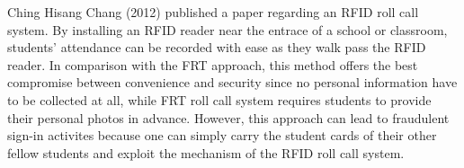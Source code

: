 Ching Hisang Chang (2012) published a paper regarding an RFID roll call system.
By installing an RFID reader near the entrace of a school or classroom, students' attendance
can be recorded with ease as they walk pass the RFID reader. In comparison with the FRT approach,
this method offers the best compromise between convenience and security since no personal information
have to be collected at all, while FRT roll call system requires students to provide their personal
photos in advance. However, this approach can lead to fraudulent sign-in activites because
one can simply carry the student cards of their other fellow students and exploit the mechanism
of the RFID roll call system.
